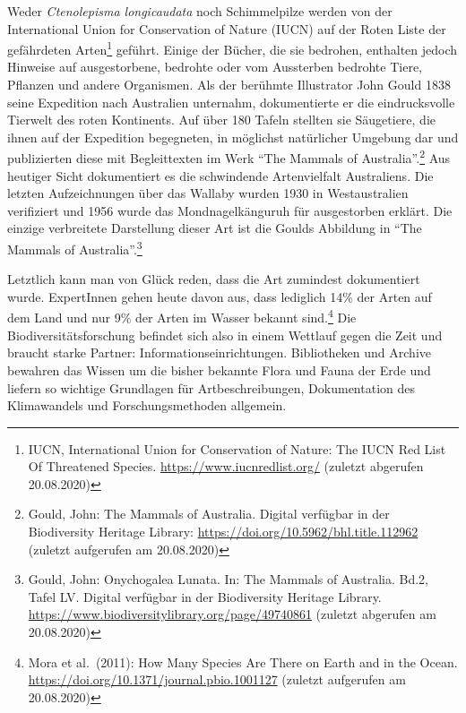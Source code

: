 \documentclass[a4paper,
fontsize=11pt,
oneside,
numbers=noperiodatend,
parskip=half-,
bibliography=totoc,
final
]{scrartcl}
\begin{document}
Weder \emph{Ctenolepisma longicaudata} noch Schimmelpilze werden von der
International Union for Conservation of Nature (IUCN) auf der Roten
Liste der gefährdeten Arten\footnote{IUCN, International Union for
  Conservation of Nature: The IUCN Red List Of Threatened Species.
  \url{https://www.iucnredlist.org/} (zuletzt abgerufen 20.08.2020)}
geführt. Einige der Bücher, die sie bedrohen, enthalten jedoch Hinweise
auf ausgestorbene, bedrohte oder vom Aussterben bedrohte Tiere, Pflanzen
und andere Organismen. Als der berühmte Illustrator John Gould 1838
seine Expedition nach Australien unternahm, dokumentierte er die
eindrucksvolle Tierwelt des roten Kontinents. Auf über 180 Tafeln
stellten sie Säugetiere, die ihnen auf der Expedition begegneten, in
möglichst natürlicher Umgebung dar und publizierten diese mit
Begleittexten im Werk \enquote{The Mammals of Australia}.\footnote{Gould,
  John: The Mammals of Australia. Digital verfügbar in der Biodiversity
  Heritage Library: \url{https://doi.org/10.5962/bhl.title.112962}
  (zuletzt aufgerufen am 20.08.2020)} Aus heutiger Sicht dokumentiert es
die schwindende Artenvielfalt Australiens. Die letzten Aufzeichnungen
über das Wallaby wurden 1930 in Westaustralien verifiziert und 1956
wurde das Mondnagelkänguruh für ausgestorben erklärt. Die einzige
verbreitete Darstellung dieser Art ist die Goulds Abbildung in
\enquote{The Mammals of Australia}.\footnote{Gould, John: Onychogalea
  Lunata. In: The Mammals of Australia. Bd.2, Tafel LV. Digital
  verfügbar in der Biodiversity Heritage Library.
  \url{https://www.biodiversitylibrary.org/page/49740861} (zuletzt
  abgerufen am 20.08.2020)}

Letztlich kann man von Glück reden, dass die Art zumindest dokumentiert
wurde. ExpertInnen gehen heute davon aus, dass lediglich 14\% der Arten
auf dem Land und nur 9\% der Arten im Wasser bekannt sind.\footnote{Mora
  et al.~(2011): How Many Species Are There on Earth and in the Ocean.
  \url{https://doi.org/10.1371/journal.pbio.1001127} (zuletzt aufgerufen
  am 20.08.2020)} Die Biodiversitätsforschung befindet sich also in
einem Wettlauf gegen die Zeit und braucht starke Partner:
Informationseinrichtungen. Bibliotheken und Archive bewahren das Wissen
um die bisher bekannte Flora und Fauna der Erde und liefern so wichtige
Grundlagen für Artbeschreibungen, Dokumentation des Klimawandels und
Forschungsmethoden allgemein.
\end{document}
